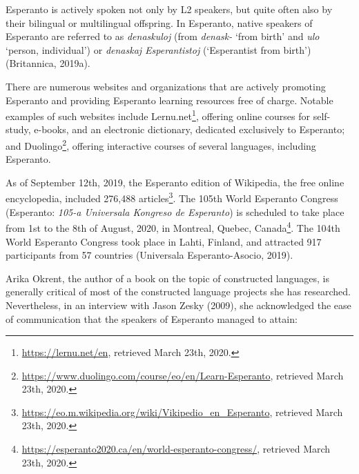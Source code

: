 Esperanto is actively spoken not only by L2 speakers, but quite often also by their bilingual or multilingual offspring.
In Esperanto, native speakers of Esperanto are referred to as \textit{denaskuloj} (from \textit{denask-} `from birth' and \textit{ulo} `person, individual') or \textit{denaskaj Esperantistoj} (`Esperantist from birth')
(Britannica, 2019a).

There are numerous websites and organizations that are actively promoting Esperanto and providing Esperanto learning resources free of charge.
Notable examples of such websites include Lernu.net\footnote{\url{https://lernu.net/en}, retrieved March 23th, 2020.}, offering online courses for self-study, e-books, and an electronic dictionary, dedicated exclusively to Esperanto; and Duolingo\footnote{\url{https://www.duolingo.com/course/eo/en/Learn-Esperanto}, retrieved March 23th, 2020.}, offering interactive courses of several languages, including Esperanto.

As of September 12th, 2019, the Esperanto edition of Wikipedia, the free online encyclopedia, included 276,488 articles\footnote{\url{https://eo.m.wikipedia.org/wiki/Vikipedio_en_Esperanto}, retrieved March 23th, 2020.}.
The 105th World Esperanto Congress (Esperanto: \textit{105-a Universala Kongreso de Esperanto}) is scheduled to take place from 1st to the 8th of August, 2020, in Montreal, Quebec, Canada\footnote{\url{https://esperanto2020.ca/en/world-esperanto-congress/}, retrieved March 23th, 2020.}.
The 104th World Esperanto Congress took place in Lahti, Finland, and attracted 917 participants from 57 countries (Universala Esperanto-Asocio, 2019).


Arika Okrent, the author of a book on the topic of constructed languages, is generally critical of most of the constructed language projects she has researched.
Nevertheless, in an interview with Jason Zesky (2009), she acknowledged the ease of communication that the speakers of Esperanto managed to attain:



